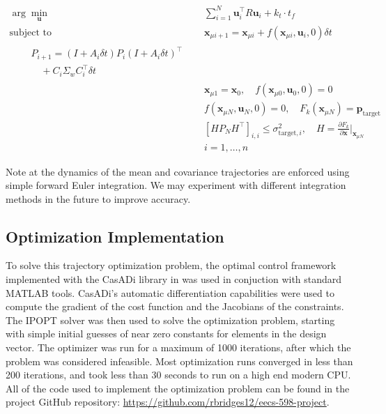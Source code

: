 \documentclass[letterpaper, 10pt, conference]{ieeeconf}
\begin{document}
\begin{align}
    \arg\min_{\mathbf{u}} &\quad \sum_{i=1}^{N} \mathbf{u}_i^\top R \mathbf{u}_i + k_t \cdot t_f \label{eq:dcost} \\
    \text{subject to} &\quad \mathbf{x}_{\mu i+1} = \mathbf{x}_{\mu i} + f(\mathbf{x}_{\mu i}, \mathbf{u}_i, 0) \delta t \\
    \begin{split}
        &\quad P_{i+1} = (I + A_i \delta t)P_i(I + A_i \delta t)^\top \\
        &\quad \quad + C_i \Sigma_w C_i^\top \delta t
    \end{split} \label{test} \\
    &\quad \mathbf{x}_{\mu 1} = \mathbf{x}_0, \quad f(\mathbf{x}_{\mu 0}, \mathbf{u}_0, 0) = 0 \\
    &\quad f(\mathbf{x}_{\mu N}, \mathbf{u}_N, 0) = 0, \quad F_k(\mathbf{x}_{\mu N}) = \mathbf{p}_{\text{target}} \label{eq:dtarget_constraint} \\
    &\quad [HP_NH^\top]_{i,i} \leq \sigma_{\text{target}, i}^2, \quad H = \frac{\partial F_k}{\partial \mathbf{x}}\bigg|_{\mathbf{x}_{\mu N}} \\
    &\quad i = 1, \ldots, n \label{eq:dtarget_variance_constraint}
\end{align}

Note at the dynamics of the mean and covariance trajectories are enforced using simple forward Euler integration. We may experiment with different integration methods in the future to improve accuracy.

\subsection{Optimization Implementation}
To solve this trajectory optimization problem, the optimal control framework implemented with the CasADi library in \cite{c5} was used in conjuction with standard MATLAB tools. CasADi's automatic differentiation capabilities were used to compute the gradient of the cost function and the Jacobians of the constraints. The IPOPT solver was then used to solve the optimization problem, starting with simple initial guesses of near zero constants for elements in the design vector. The optimizer was run for a maximum of 1000 iterations, after which the problem was considered infeasible. Most optimization runs converged in less than 200 iterations, and took less than 30 seconds to run on a high end modern CPU. All of the code used to implement the optimization problem can be found in the project GitHub repository: \href{https://github.com/rbridges12/eecs-598-project}{https://github.com/rbridges12/eecs-598-project}.
\end{document}
